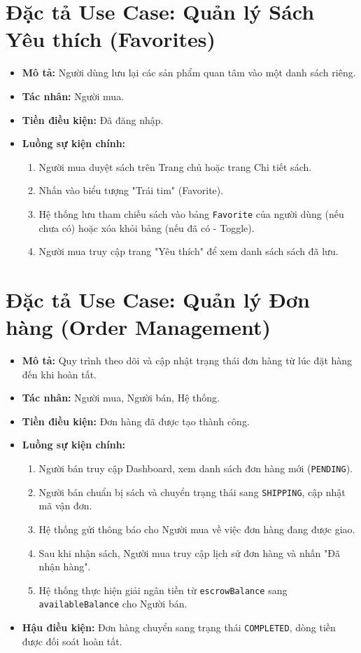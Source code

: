 \documentclass[../main.tex]{subfiles}
\begin{document}
\section{Đặc tả Use Case: Quản lý Sách Yêu thích (Favorites)}
\begin{itemize}
    \item \textbf{Mô tả:} Người dùng lưu lại các sản phẩm quan tâm vào một danh sách riêng.
    \item \textbf{Tác nhân:} Người mua.
    \item \textbf{Tiền điều kiện:} Đã đăng nhập.
    \item \textbf{Luồng sự kiện chính:}
        \begin{enumerate}
            \item Người mua duyệt sách trên Trang chủ hoặc trang Chi tiết sách.
            \item Nhấn vào biểu tượng "Trái tim" (Favorite).
            \item Hệ thống lưu tham chiếu sách vào bảng \texttt{Favorite} của người dùng (nếu chưa có) hoặc xóa khỏi bảng (nếu đã có - Toggle).
            \item Người mua truy cập trang "Yêu thích" để xem danh sách sách đã lưu.
        \end{enumerate}
\end{itemize}

\section{Đặc tả Use Case: Quản lý Đơn hàng (Order Management)}
\begin{itemize}
    \item \textbf{Mô tả:} Quy trình theo dõi và cập nhật trạng thái đơn hàng từ lúc đặt hàng đến khi hoàn tất.
    \item \textbf{Tác nhân:} Người mua, Người bán, Hệ thống.
    \item \textbf{Tiền điều kiện:} Đơn hàng đã được tạo thành công.
    \item \textbf{Luồng sự kiện chính:}
        \begin{enumerate}
            \item Người bán truy cập Dashboard, xem danh sách đơn hàng mới (\texttt{PENDING}).
            \item Người bán chuẩn bị sách và chuyển trạng thái sang \texttt{SHIPPING}, cập nhật mã vận đơn.
            \item Hệ thống gửi thông báo cho Người mua về việc đơn hàng đang được giao.
            \item Sau khi nhận sách, Người mua truy cập lịch sử đơn hàng và nhấn "Đã nhận hàng".
            \item Hệ thống thực hiện giải ngân tiền từ \texttt{escrowBalance} sang \texttt{availableBalance} cho Người bán.
        \end{enumerate}
    \item \textbf{Hậu điều kiện:} Đơn hàng chuyển sang trạng thái \texttt{COMPLETED}, dòng tiền được đối soát hoàn tất.
\end{itemize}
\end{document}
